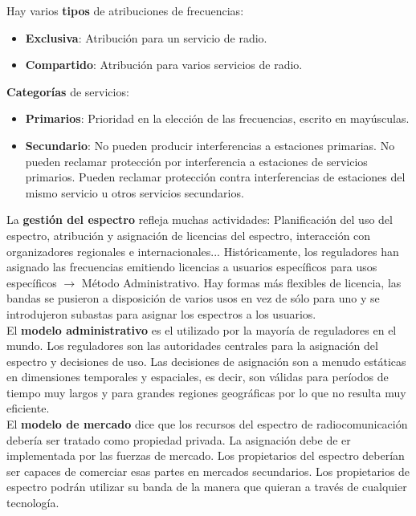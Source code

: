 \documentclass[10pt,portrait, twocolumn]{article}
\begin{document}
Hay varios \textbf{tipos} de atribuciones de frecuencias:

	\begin{itemize}
		\item \textbf{Exclusiva}: Atribución para un servicio de radio.
		\item \textbf{Compartido}: Atribución para varios servicios de radio.
	\end{itemize}
	
\textbf{Categorías} de servicios:

	\begin{itemize}
		\item \textbf{Primarios}: Prioridad en la elección de las frecuencias, escrito en mayúsculas.
		\item \textbf{Secundario}: No pueden producir interferencias a estaciones primarias. No pueden reclamar protección por interferencia a estaciones de servicios primarios. Pueden reclamar protección contra interferencias de estaciones del mismo servicio u otros servicios secundarios.
	\end{itemize}
	
La \textbf{gestión del espectro} refleja muchas actividades: Planificación del uso del espectro, atribución y asignación de licencias del espectro, interacción con organizadores regionales e internacionales... Históricamente, los reguladores han asignado las frecuencias emitiendo licencias a usuarios específicos para usos específicos $\rightarrow$ Método Administrativo. Hay formas más flexibles de licencia, las bandas se pusieron a disposición de varios usos en vez de sólo para uno y se introdujeron subastas para asignar los espectros a los usuarios.\\

El \textbf{modelo administrativo} es el utilizado por la mayoría de reguladores en el mundo. Los reguladores son las autoridades centrales para la asignación del espectro y decisiones de uso. Las decisiones de asignación son a menudo estáticas en dimensiones temporales y espaciales, es decir, son válidas para períodos de tiempo muy largos y para grandes regiones geográficas por lo que no resulta muy eficiente.\\

El \textbf{modelo de mercado} dice que los recursos del espectro de radiocomunicación debería ser tratado como propiedad privada. La asignación debe de er implementada por las fuerzas de mercado. Los propietarios del espectro deberían ser capaces de comerciar esas partes en mercados secundarios. Los propietarios de espectro podrán utilizar su banda de la manera que quieran a través de cualquier tecnología.\\
\end{document}
